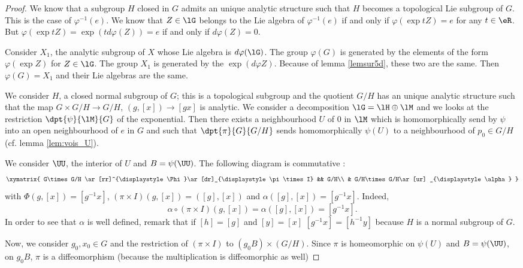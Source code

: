 \begin{proof}
 We know that a subgroup $H$ closed in $G$ admits an unique analytic structure such that $H$ becomes a topological Lie subgroup of $G$. This is the case of $\varphi^{-1}(e)$. We know that $Z\in\lG$ belongs to the Lie algebra of $\varphi^{-1}(e)$ if and only if $\varphi(\exp tZ)=e$ for any $t\in\eR$. But $\varphi(\exp tZ)=\exp(td\varphi(Z))=e$ if and only if $d\varphi(Z)=0$.

Consider $X_1$, the analytic subgroup of $X$ whose Lie algebra is $d\varphi(\lG)$. The group $\varphi(G)$ is generated by the elements of the form $\varphi(\exp Z)$ for $Z\in\lG$. The group $X_1$ is generated by the $\exp(d\varphi Z)$. Because of lemma \ref{lemsur5d}, these two are the same. Then $\varphi(G)=X_1$ and their Lie algebras are the same.

We consider $H$, a closed normal subgroup of $G$; this is a topological subgroup and the quotient $G/H$ has an unique analytic structure such that the map $G\times G/H\to G/H$, $(g,[x])\to [gx]$ is analytic. We consider a decomposition $\lG=\lH\oplus\lM$ and we looks at the restriction $\dpt{\psi}{\lM}{G}$ of the exponential. Then there exists a neighbourhood $U$ of $0$ in $\lM$ which is homomorphically send by  $\psi$ into an open neighbourhood of $e$ in $G$ and such that $\dpt{\pi}{G}{G/H}$ sends homomorphically $\psi(U)$ to a neighbourhood  of $p_0\in G/H$ (cf. lemma \ref{lem:vois_U}).

We consider $\UU$, the interior of $U$ and $B=\psi(\UU)$. The following diagram is commutative :
\begin{equation}
 \xymatrix{
    G\times G/H  \ar[rr]^{\displaystyle\Phi}\ar[dr]_{\displaystyle \pi\times I} &&  G/H\\
     &     G/H\times G/H\ar[ur] _{\displaystyle\alpha}
  }
\end{equation}
with $\Phi(g,[x])=[g^{-1} x]$, $(\pi\times I)(g,[x])=([g],[x])$ and $\alpha([g],[x])=[g^{-1} x]$. Indeed, 
\[
   \alpha\circ(\pi\times I)(g,[x])=\alpha([g],[x])=[g^{-1} x].
\]
In order to see that $\alpha$ is well defined, remark that if $[h]=[g]$ and $[y]=[x]$ $[g^{-1} x]=[h^{-1} y]$ because $H$ is a normal subgroup of $G$.

Now, we consider $g_0,x_0\in G$ and the restriction of $(\pi\times I)$ to $(g_0B)\times(G/H)$. Since $\pi$ is homeomorphic on $\psi(U)$ and $B=\psi(\UU)$, on $g_0B$, $\pi$ is a diffeomorphism (because the multiplication is diffeomorphic as well)


\end{proof}
